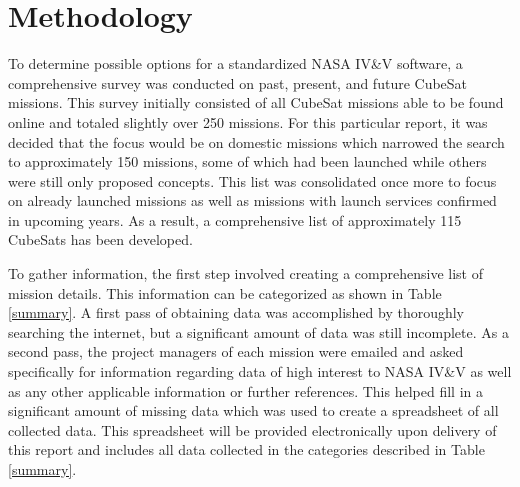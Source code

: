 \documentclass[11pt]{article}
\begin{document}
\section{Methodology}
To determine possible options for a standardized NASA IV\&V software, a comprehensive survey was conducted on past, present, and future CubeSat missions.  This survey initially consisted of all CubeSat missions able to be found online and totaled slightly over 250 missions.  For this particular report, it was decided that the focus would be on domestic missions which narrowed the search to approximately 150 missions, some of which had been launched while others were still only proposed concepts.  This list was consolidated once more to focus on already launched missions as well as missions with launch services confirmed in upcoming years.  
As a result, a comprehensive list of approximately 115 CubeSats has been developed.  

To gather information, the first step involved creating a comprehensive list of mission details.  This information can be categorized as shown in Table \ref{summary}.  A first pass of obtaining data was accomplished by thoroughly searching the internet, but a significant amount of data was still incomplete.  As a second pass, the project managers of each mission were emailed and asked specifically for information regarding data of high interest to NASA IV\&V as well as any other applicable information or further references.  This helped fill in a significant amount of missing data which was used to create a spreadsheet of all collected data.  This spreadsheet will be provided electronically upon delivery of this report and includes all data collected in the categories described in Table \ref{summary}.
\end{document}
